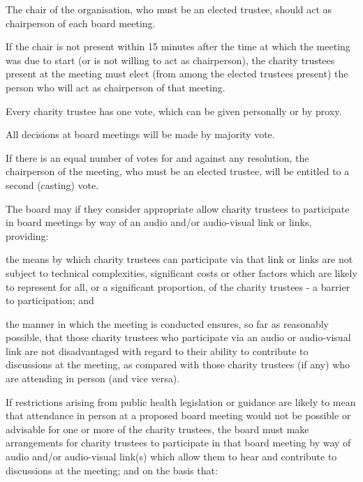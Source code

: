 ﻿\documentclass[a4paper,11pt,onecolumn ]{article}
\begin{document}
\begin{legal}
\item The chair of the organisation, who must be an elected trustee, should act as chairperson of each board meeting.
\item If the chair is not present within 15 minutes after the time at which the meeting was due to start (or is not willing to act as chairperson), the charity trustees present at the meeting must elect (from among the elected trustees present) the person who will act as chairperson of that meeting.
\item Every charity trustee has one vote, which can be given personally or by proxy. 
\item All decisions at board meetings will be made by majority vote.
\item If there is an equal number of votes for and against any resolution, the chairperson of the meeting, who must be an elected trustee, will be entitled to a second (casting) vote.
\item The board may if they consider appropriate allow charity trustees to participate in board meetings by way of an audio and/or audio-visual link or links, providing: 
    \begin{legal}[label=\alph*)]
    \item the means by which charity trustees can participate via that link or links are not subject to technical complexities, significant costs or other factors which are likely to represent for all, or a significant proportion, of the charity trustees - a barrier to participation; and 
    \item the manner in which the meeting is conducted ensures, so far as reasonably possible, that those charity trustees who participate via an audio or audio-visual link are not disadvantaged with regard to their ability to contribute to discussions at the meeting, as compared with those charity trustees (if any) who are attending in person (and vice versa).
    \end{legal}
\item If restrictions arising from public health legislation or guidance are likely to mean that attendance in person at a proposed board meeting would not be possible or advisable for one or more of the charity trustees, the board must make arrangements for charity trustees to participate in that board meeting by way of audio and/or audio-visual link(s) which allow them to hear and contribute to discussions at the meeting; and on the basis that: 
    \begin{legal}[label=\alph*)]

\end{legal}
\end{legal}
\end{document}
